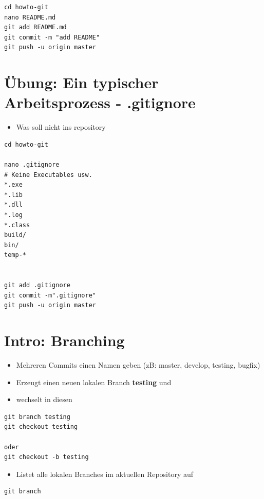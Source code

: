 \documentclass[11pt]{article}
\begin{document}
\begin{verbatim}
cd howto-git
nano README.md
git add README.md
git commit -m "add README"
git push -u origin master
\end{verbatim}


\section{Übung: Ein typischer Arbeitsprozess - .gitignore}
\label{sec:orgcf0c91e}

\begin{itemize}
\item Was soll nicht ins repository
\end{itemize}

\begin{verbatim}
cd howto-git

nano .gitignore
# Keine Executables usw.
*.exe
*.lib
*.dll 
*.log
*.class
build/
bin/
temp-*


git add .gitignore
git commit -m".gitignore"
git push -u origin master
\end{verbatim}


\section{Intro: Branching}
\label{sec:org508439c}

\begin{itemize}
\item Mehreren Commits einen Namen geben (zB: master, develop, testing, bugfix)
\end{itemize}


\begin{itemize}
\item Erzeugt einen neuen lokalen Branch \textbf{testing} und
\item wechselt in diesen
\end{itemize}
\begin{verbatim}
git branch testing
git checkout testing

oder
git checkout -b testing
\end{verbatim}


\begin{itemize}
\item Listet alle lokalen Branches im aktuellen Repository auf
\end{itemize}
\begin{verbatim}
git branch
\end{verbatim}
\end{document}
